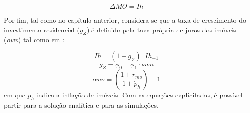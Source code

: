 \begin{equation}
    \label{EqMO}
    \Delta MO = Ih
\end{equation}

Por fim, tal como no capítulo anterior, considera-se que a taxa de crescimento do investimento residencial ($g_Z$) é definido pela taxa própria de juros dos imóveis (\textit{own}) tal como em \textcite{teixeira_crescimento_2015}:

\begin{equation}
    Ih = (1 + g_Z)\cdot Ih_{-1}
\end{equation}
\begin{equation}
g_Z = \phi_0 - \phi_1\cdot own
\end{equation}
\begin{equation}
own = \left(\frac{1+r_{mo}}{1+\dot p_h}\right) -1
\end{equation}
em que $\dot p_h$ indica a inflação de imóveis. 
Com as equações explicitadas, é possível partir para a solução analítica e para as simulações. 